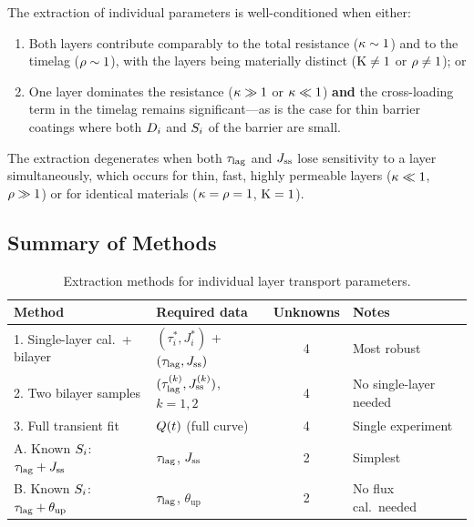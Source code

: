\begin{proposition}
\label{prop:well-posed}
The extraction of individual parameters is well-conditioned when either:
\begin{enumerate}
  \item Both layers contribute comparably to the total resistance
        ($\kappa \sim 1$) and to the timelag ($\rho \sim 1$), with the
        layers being materially distinct ($\mathrm{K} \neq 1$ or $\rho \neq 1$);
        or
  \item One layer dominates the resistance ($\kappa \gg 1$ or $\kappa \ll 1$)
        \textbf{and} the cross-loading term in the timelag remains
        significant---as is the case for thin barrier coatings where both
        $D_{i}$ and $S_{i}$ of the barrier are small.
\end{enumerate}
The extraction degenerates when both $\tau_{\mathrm{lag}}$ and $J_{\mathrm{ss}}$ lose sensitivity to
a layer simultaneously, which occurs for thin, fast, highly permeable layers
($\kappa \ll 1$, $\rho \gg 1$) or for identical materials
($\kappa = \rho = 1$, $\mathrm{K} = 1$).
\end{proposition}

\subsection{Summary of Methods}
\label{sec:method-summary}

\begin{table}[ht]
\centering
\caption{Extraction methods for individual layer transport parameters.}
\label{tab:methods}
\begin{tabular}{@{}llcl@{}}
\toprule
\textbf{Method} & \textbf{Required data}
  & \textbf{Unknowns} & \textbf{Notes} \\
\midrule
1. Single-layer cal.\ + bilayer
  & $(\tau_i^*, J_i^*)$ + $(\tau_{\mathrm{lag}}, J_{\mathrm{ss}})$
  & 4 & Most robust \\
2. Two bilayer samples
  & $(\tau_{\mathrm{lag}}^{(k)}, J_{\mathrm{ss}}^{(k)})$, $k=1,2$
  & 4 & No single-layer needed \\
3. Full transient fit
  & $Q(t)$ (full curve)
  & 4 & Single experiment \\
A. Known $S_{i}$: $\tau_{\mathrm{lag}} + J_{\mathrm{ss}}$
  & $\tau_{\mathrm{lag}}$, $J_{\mathrm{ss}}$
  & 2 & Simplest \\
B. Known $S_{i}$: $\tau_{\mathrm{lag}} + \theta_{\mathrm{up}}$
  & $\tau_{\mathrm{lag}}$, $\theta_{\mathrm{up}}$
  & 2 & No flux cal.\ needed \\
\bottomrule
\end{tabular}
\end{table}

